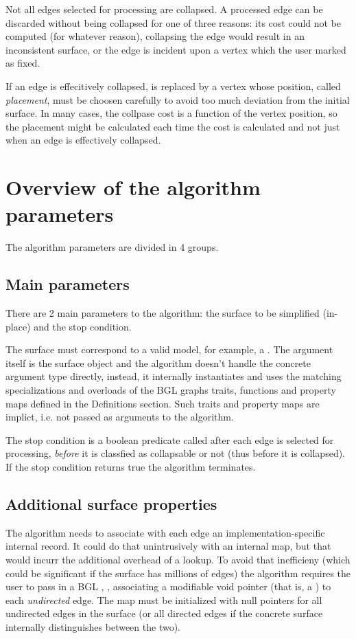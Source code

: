 Not all edges selected for processing are collapsed. A processed edge can be discarded without being collapsed for one of three reasons: its cost could not be computed (for whatever reason), collapsing the edge would result in an inconsistent surface, or the edge is incident upon a vertex which the user marked as fixed.

If an edge is effecitively collapsed, is replaced by a vertex whose position, called {\em placement}, must be choosen carefully to avoid too much deviation from the initial surface. In many cases, the collpase cost is a function of the vertex position, so the placement might be calculated each time the cost is calculated and not just when an edge is effectively collapsed.

\section{Overview of the algorithm parameters}

The algorithm parameters are divided in 4 groups.

\subsection{Main parameters}

There are 2 main parameters to the algorithm: the surface to be simplified (in-place) and the stop condition.

The surface must correspond to a valid  model, for example, a . The argument itself is the surface object and the algorithm doesn't handle the concrete argument type directly, instead, it internally instantiates and uses the matching specializations and overloads of the BGL graphs traits, functions and property maps defined in the Definitions section. Such traits and property maps are implict, i.e. not passed as arguments to the algorithm.

The stop condition is a boolean predicate called after each edge is selected for processing, {\em before} it is classfied as collapsable or not (thus before it is collapsed). If the stop condition returns true the algorithm terminates.

\subsection{Additional surface properties}

The algorithm needs to associate with each edge an implementation-specific internal record. It could do that unintrusively with an internal map, but that would incurr the additional overhead of a lookup. To avoid that inefficieny (which could be significant if the surface has millions of edges) the algorithm requires the user to pass in a BGL , , associating a modifiable void pointer (that is, a ) to each {\em undirected} edge. The map must be initialized with null pointers for all undirected edges in the surface (or all directed edges if the concrete surface internally distinguishes between the two). 

